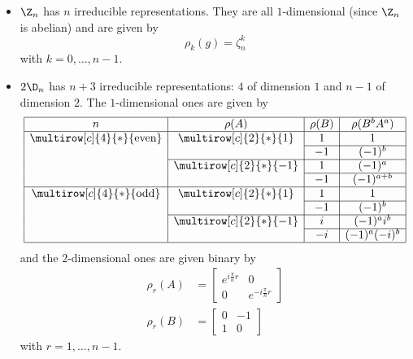 \documentclass{worksheetclass}
\begin{document}
            \begin{itemize}
                \item $\Z_n$ has $n$ irreducible representations. They are all $1$-dimensional (since $\Z_n$ is abelian) and are given by
                \begin{equation}
                    \rho_k(g)=\zeta^k_n
                \end{equation}
                with $k=0,\dots,n-1$.
                \item $2\D_n$ has $n+3$ irreducible representations: $4$ of dimension $1$ and $n-1$ of dimension $2$. The $1$-dimensional ones are given by
                \begin{equation*}
                \begin{array}{|c|c|c|c|}
                    \hline
                    n & \rho(A) & \rho(B) & \rho(B^bA^a) \\
                    \hline
                    \multirow[c]{4}{*}{\text{even}} & \multirow[c]{2}{*}{1} & 1 & 1 \\ \cline{3-4}
                    & & -1 & (-1)^b \\ \cline{2-4}
                    & \multirow[c]{2}{*}{-1} & 1 & (-1)^a \\ \cline{3-4}
                    & & -1 & (-1)^{a+b} \\
                    \hline
                    \multirow[c]{4}{*}{\text{odd}} & \multirow[c]{2}{*}{1} & 1 & 1 \\ \cline{3-4}
                    & & -1 & (-1)^b \\ \cline{2-4}
                    & \multirow[c]{2}{*}{-1} & i & (-1)^ai^b \\ \cline{3-4}
                    & & -i & (-1)^a(-i)^b \\
                    \hline
                \end{array}
                \end{equation*}
                and the $2$-dimensional ones are given binary by
                \begin{align*}
                    \rho_r(A) &= 
                    \begin{bmatrix}
                        e^{i\frac{\pi}{n}r} & 0\\
                        0 & e^{-i\frac{\pi}{n}r} 
                    \end{bmatrix}\\
                    \rho_r(B) &= 
                    \begin{bmatrix}
                        0 & -1 \\
                        1 & 0
                    \end{bmatrix}
                \end{align*}
                with $r=1,\dots,n-1$.
            \end{itemize}
\end{document}
